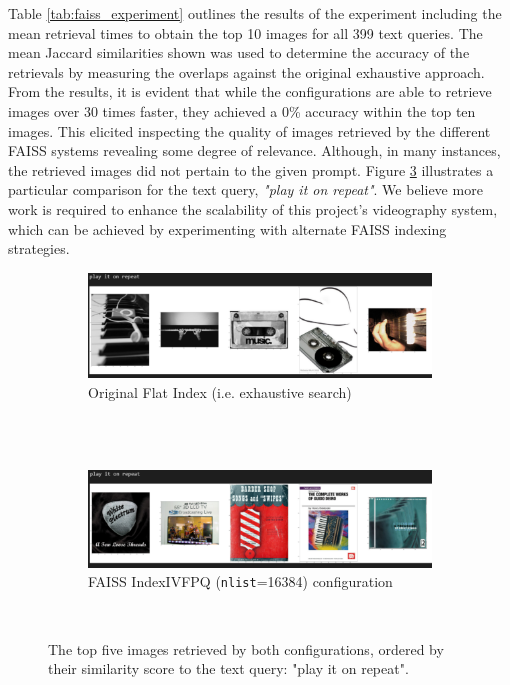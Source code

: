 \documentclass{l4proj}
\begin{document}
Table \ref{tab:faiss_experiment} outlines the results of the experiment including the mean retrieval times to obtain the top 10 images for all 399 text queries. The mean Jaccard similarities shown was used to determine the accuracy of the retrievals by measuring the overlaps against the original exhaustive approach. From the results, it is evident that while the configurations are able to retrieve images over 30 times faster, they achieved a 0\% accuracy within the top ten images. This elicited inspecting the quality of images retrieved by the different FAISS systems revealing some degree of relevance. Although, in many instances, the retrieved images did not pertain to the given prompt. Figure \ref{fig:faiss_retrieval_comp} illustrates a particular comparison for the text query, \emph{"play it on repeat"}. We believe more work is required to enhance the scalability of this project's videography system, which can be achieved by experimenting with alternate FAISS indexing strategies.

\begin{figure}[htb]
    \centering
    \begin{subfigure}[b]{1\textwidth}
        \includegraphics[width=\textwidth]{figures/exhaustive_retrievals.pdf}
        \caption{Original Flat Index (i.e. exhaustive search)}
        \label{fig:exhaustive_retrievals}
    \end{subfigure} \\
    ~ 
    \par\medskip
    \begin{subfigure}[b]{1\textwidth}
        \includegraphics[width=\textwidth]{figures/faiss_retrievals.pdf}
        \caption{FAISS IndexIVFPQ (\lstinline|nlist|=16384) configuration}
        \label{fig:faiss_retrievals}
    \end{subfigure}
    ~    
    \caption{The top five images retrieved by both configurations, ordered by their similarity score to the text query: "play it on repeat".}
    \label{fig:faiss_retrieval_comp}
\end{figure}
\end{document}
